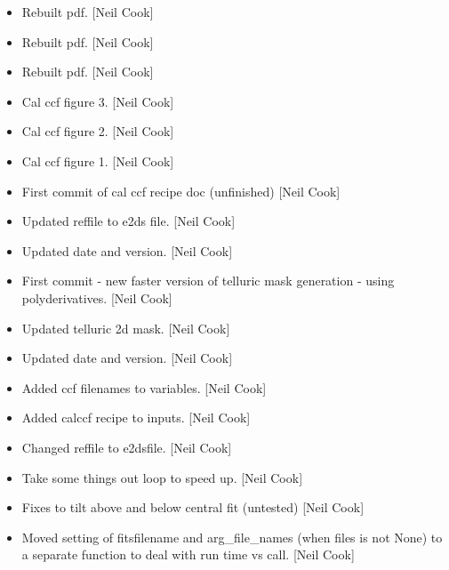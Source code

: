 \documentclass[a4paper,10pt,english]{report}
\begin{document}
\label{\detokenize{misc/changelog:id478}}\begin{itemize}
\item {} 
Rebuilt pdf. {[}Neil Cook{]}

\item {} 
Rebuilt pdf. {[}Neil Cook{]}

\item {} 
Rebuilt pdf. {[}Neil Cook{]}

\item {} 
Cal ccf figure 3. {[}Neil Cook{]}

\item {} 
Cal ccf figure 2. {[}Neil Cook{]}

\item {} 
Cal ccf figure 1. {[}Neil Cook{]}

\item {} 
First commit of cal ccf recipe doc (unfinished) {[}Neil Cook{]}

\item {} 
Updated reffile to e2ds file. {[}Neil Cook{]}

\item {} 
Updated date and version. {[}Neil Cook{]}

\item {} 
First commit - new faster version of telluric mask generation - using
polyderivatives. {[}Neil Cook{]}

\item {} 
Updated telluric 2d mask. {[}Neil Cook{]}

\item {} 
Updated date and version. {[}Neil Cook{]}

\item {} 
Added ccf filenames to variables. {[}Neil Cook{]}

\item {} 
Added calccf recipe to inputs. {[}Neil Cook{]}

\item {} 
Changed reffile to e2dsfile. {[}Neil Cook{]}

\item {} 
Take some things out loop to speed up. {[}Neil Cook{]}

\item {} 
Fixes to tilt above and below central fit (untested) {[}Neil Cook{]}

\item {} 
Moved setting of fitsfilename and arg\_file\_names (when files is not
None) to a separate function to deal with run time vs call. {[}Neil
Cook{]}


\end{itemize}
\end{document}
